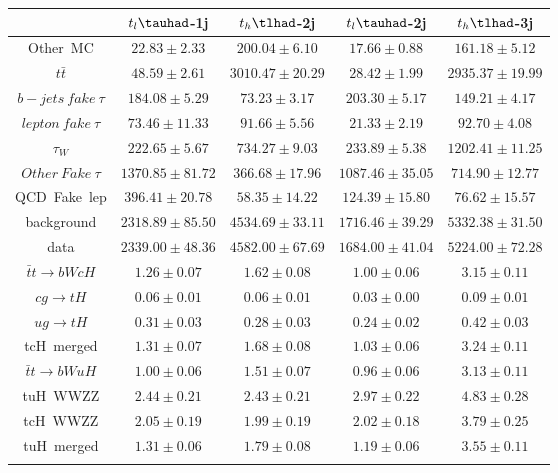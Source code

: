 \centering
\begin{tabular}{ccccc} \toprule\toprule
 & $t_{l}\tauhad$-1j & $t_{h}\tlhad$-2j & $t_{l}\tauhad$-2j & $t_{h}\tlhad$-3j\\\midrule
Other~MC & $22.83\pm2.33$ & $200.04\pm6.10$ & $17.66\pm0.88$ & $161.18\pm5.12$\\
$t\bar{t}$ & $48.59\pm2.61$ & $3010.47\pm20.29$ & $28.42\pm1.99$ & $2935.37\pm19.99$\\
$b-jets~fake~\tau$ & $184.08\pm5.29$ & $73.23\pm3.17$ & $203.30\pm5.17$ & $149.21\pm4.17$\\
$lepton~fake~\tau$ & $73.46\pm11.33$ & $91.66\pm5.56$ & $21.33\pm2.19$ & $92.70\pm4.08$\\
$\tau_{W}$ & $222.65\pm5.67$ & $734.27\pm9.03$ & $233.89\pm5.38$ & $1202.41\pm11.25$\\
$Other~Fake~\tau$ & $1370.85\pm81.72$ & $366.68\pm17.96$ & $1087.46\pm35.05$ & $714.90\pm12.77$\\
QCD~Fake~lep & $396.41\pm20.78$ & $58.35\pm14.22$ & $124.39\pm15.80$ & $76.62\pm15.57$\\
background & $2318.89\pm85.50$ & $4534.69\pm33.11$ & $1716.46\pm39.29$ & $5332.38\pm31.50$\\
data & $2339.00\pm48.36$ & $4582.00\pm67.69$ & $1684.00\pm41.04$ & $5224.00\pm72.28$\\
$\bar{t}t\to bWcH$ & $1.26\pm0.07$ & $1.62\pm0.08$ & $1.00\pm0.06$ & $3.15\pm0.11$\\
$cg\to tH$ & $0.06\pm0.01$ & $0.06\pm0.01$ & $0.03\pm0.00$ & $0.09\pm0.01$\\
$ug\to tH$ & $0.31\pm0.03$ & $0.28\pm0.03$ & $0.24\pm0.02$ & $0.42\pm0.03$\\
tcH~merged & $1.31\pm0.07$ & $1.68\pm0.08$ & $1.03\pm0.06$ & $3.24\pm0.11$\\
$\bar{t}t\to bWuH$ & $1.00\pm0.06$ & $1.51\pm0.07$ & $0.96\pm0.06$ & $3.13\pm0.11$\\
tuH~WWZZ & $2.44\pm0.21$ & $2.43\pm0.21$ & $2.97\pm0.22$ & $4.83\pm0.28$\\
tcH~WWZZ & $2.05\pm0.19$ & $1.99\pm0.19$ & $2.02\pm0.18$ & $3.79\pm0.25$\\
tuH~merged & $1.31\pm0.06$ & $1.79\pm0.08$ & $1.19\pm0.06$ & $3.55\pm0.11$\\
\bottomrule\bottomrule\\
\end{tabular}
